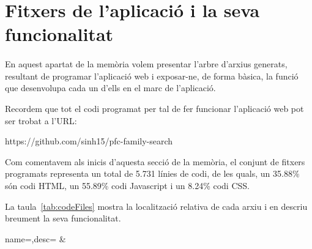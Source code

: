 \section{Fitxers de l'aplicació i la seva funcionalitat}

    \paragraph{}
    En aquest apartat de la memòria volem presentar l'arbre d'arxius generats, resultant de programar l'aplicació web i exposar-ne, de forma bàsica, la funció que desenvolupa cada un d'ells en el marc de l'aplicació.

    Recordem que tot el codi programat per tal de fer funcionar l’aplicació web pot ser trobat a l'URL:

    \begin{displayquote}
        https://github.com/sinh15/pfc-family-search
    \end{displayquote}

    Com comentavem als inicis d'aquesta secció de la memòria, el conjunt de fitxers programats representa un total de 5.731 línies de codi, de les quals, un 35.88\% són codi HTML, un 55.89\% codi Javascript i un 8.24\% codi CSS.

    La taula~\ref{tab:codeFiles} mostra la localització relativa de cada arxiu i en descriu breument la seva funcionalitat.

    \begin{center}
             {name=\name,desc=\desc}
             {\name&\desc}
     \end{center}
